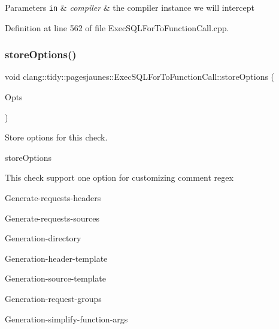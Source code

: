 \begin{DoxyParams}[1]{Parameters}
\mbox{\tt in}  & {\em compiler} & the compiler instance we will intercept \\
\hline
\end{DoxyParams}


Definition at line 562 of file Exec\+S\+Q\+L\+For\+To\+Function\+Call.\+cpp.

\mbox{\label{classclang_1_1tidy_1_1pagesjaunes_1_1_exec_s_q_l_for_to_function_call_ad7d6a6ef1fcbcfcc4f3dcc875815e27d}} 
\subsubsection{\texorpdfstring{store\+Options()}{storeOptions()}}
{\footnotesize\ttfamily void clang\+::tidy\+::pagesjaunes\+::\+Exec\+S\+Q\+L\+For\+To\+Function\+Call\+::store\+Options (\begin{DoxyParamCaption}\item[{Clang\+Tidy\+Options\+::\+Option\+Map \&}]{Opts }\end{DoxyParamCaption})\hspace{0.3cm}{\ttfamily [override]}}



Store options for this check. 

store\+Options

This check support one option for customizing comment regex
\begin{DoxyItemize}
\item Generate-\/requests-\/headers
\item Generate-\/requests-\/sources
\item Generation-\/directory
\item Generation-\/header-\/template
\item Generation-\/source-\/template
\item Generation-\/request-\/groups
\item Generation-\/simplify-\/function-\/args
\end{DoxyItemize}


